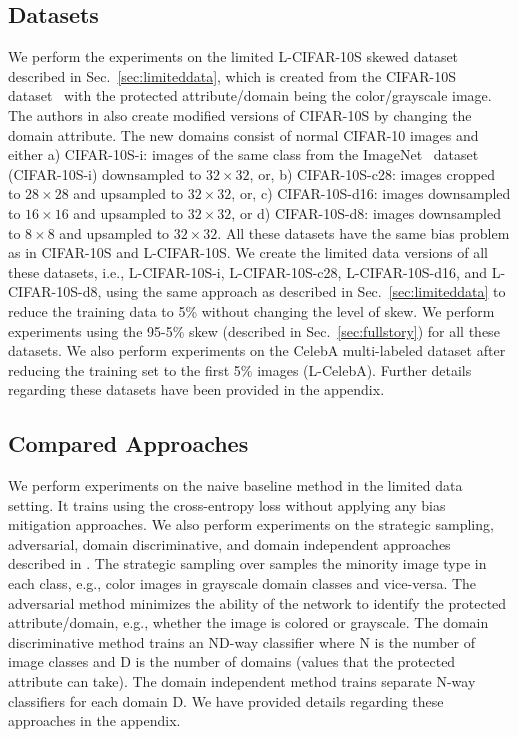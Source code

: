 \documentclass[10pt,twocolumn,letterpaper]{article}
\begin{document}
\subsection{Datasets}\label{sec:dataset}
We perform the experiments on the limited L-CIFAR-10S skewed dataset described in Sec.~\ref{sec:limiteddata}, which is created from the CIFAR-10S dataset~\cite{wang2020towards} with the protected attribute/domain being the color/grayscale image. The authors in \cite{wang2020towards} also create modified versions of CIFAR-10S by changing the domain attribute. The new domains consist of normal CIFAR-10 images and either a) CIFAR-10S-i: images of the same class from the ImageNet~\cite{russakovsky2015imagenet} dataset (CIFAR-10S-i) downsampled to $32\times32$, or, b) CIFAR-10S-c28: images cropped to $28\times28$ and upsampled to $32\times32$, or, c) CIFAR-10S-d16: images downsampled to $16\times16$ and upsampled to $32\times32$, or d) CIFAR-10S-d8: images downsampled to $8\times8$ and upsampled to $32\times32$. All these datasets have the same bias problem as in CIFAR-10S and L-CIFAR-10S. We create the limited data versions of all these datasets, i.e., L-CIFAR-10S-i, L-CIFAR-10S-c28, L-CIFAR-10S-d16, and L-CIFAR-10S-d8, using the same approach as described in Sec.~\ref{sec:limiteddata} to reduce the training data to 5\% without changing the level of skew. We perform experiments using the 95-5\% skew (described in Sec.~\ref{sec:fullstory}) for all these datasets. We also perform experiments on the CelebA multi-labeled dataset after reducing the training set to the first 5\% images (L-CelebA). Further details regarding these datasets have been provided in the appendix.

\subsection{Compared Approaches}\label{sec:compappr}
We perform experiments on the naive baseline method in the limited data setting. It trains using the cross-entropy loss without applying any bias mitigation approaches. We also perform experiments on the strategic sampling, adversarial, domain discriminative, and domain independent approaches described in \cite{wang2020towards}. The strategic sampling over samples the minority image type in each class, e.g., color images in grayscale domain classes and vice-versa. The adversarial method minimizes the ability of the network to identify the protected attribute/domain, e.g., whether the image is colored or grayscale. The domain discriminative method trains an ND-way classifier where N is the number of image classes and D is the number of domains (values that the protected attribute can take). The domain independent method trains separate N-way classifiers for each domain D. We have provided details regarding these approaches in the appendix. 
\end{document}
